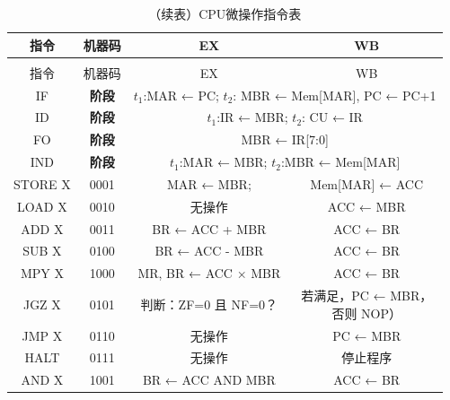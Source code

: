 \documentclass[lang=cn,a4paper,newtx]{elegantpaper}
\begin{document}
\begin{longtable}{cccc}
  \caption{CPU微操作指令表} \label{tab:five_stage_pipeline}\\
  \toprule
  指令 & 机器码  & EX & WB \\
  \midrule
  \endfirsthead

  \toprule
  \caption[]{（续表）CPU微操作指令表} \\
  \toprule
  指令 & 机器码 & EX & WB \\
  \midrule
  \endhead

  \bottomrule
  \endlastfoot
  \rowcolor{red!10}
  IF & \textbf{阶段} & \multicolumn{2}{c}{$t_1$:MAR ← PC; $t_2$: MBR ← Mem[MAR], PC ← PC+1} \\
  \midrule
  \rowcolor{yellow!10}
  ID & \textbf{阶段} & \multicolumn{2}{c}{$t_1$:IR ← MBR; $t_2$: CU ← IR}\\
  \midrule
  \rowcolor{blue!10}
  FO & \textbf{阶段} & \multicolumn{2}{c}{MBR ← IR[7:0]} \\
  \midrule
  \rowcolor{green!10}
  
  IND & \textbf{阶段} & \multicolumn{2}{c}{$t_1$:MAR ← MBR;  $t_2$:MBR ← Mem[MAR]}\\
  \midrule
  STORE X & 0001  & MAR ← MBR; & Mem[MAR] ← ACC \\

  LOAD X & 0010 &
  无操作 & 
  ACC ← MBR \\
  \midrule
  ADD X & 0011 &
  
  BR ← ACC + MBR & 
  ACC ← BR \\

  SUB X & 0100 &
  
  BR ← ACC - MBR & 
  ACC ← BR \\
  MPY X & 1000 &
  
  MR, BR ← ACC × MBR &
  ACC ← BR \\
  \midrule
  JGZ X & 0101 &
   
  判断：ZF=0 且 NF=0？ & 
  \makecell{若满足，PC ← MBR，\\否则 NOP）} \\

  JMP X & 0110 &
  
  无操作 & 
  PC ← MBR \\

  HALT & 0111 &
  
  无操作 & 
  停止程序 \\

  
  \midrule
  AND X & 1001 &
  
  BR ← ACC AND MBR &
  ACC ← BR \\


\end{longtable}
\end{document}
